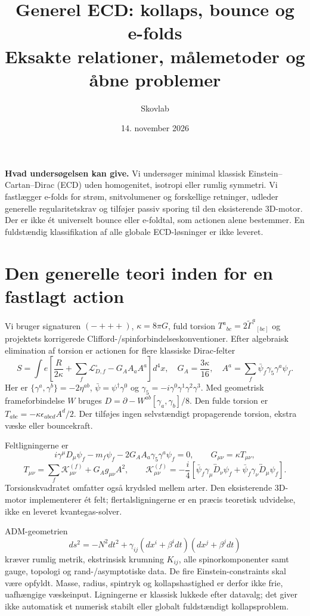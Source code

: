 \documentclass[11pt,a4paper]{article}
\title{Generel ECD: kollaps, bounce og e-folds\\\large Eksakte relationer, målemetoder og åbne problemer}
\author{Skovlab}\date{14. november 2026}
\begin{document}
\maketitle
\textbf{Hvad undersøgelsen kan give.} Vi undersøger minimal klassisk Einstein--Cartan--Dirac (ECD) uden homogenitet, isotropi eller rumlig symmetri. Vi fastlægger e-folds for strøm, snitvolumener og forskellige retninger, udleder generelle regularitetskrav og tilføjer passiv sporing til den eksisterende 3D-motor. Der er ikke ét universelt bounce eller e-foldtal, som actionen alene bestemmer. En fuldstændig klassifikation af alle globale ECD-løsninger er ikke leveret.

\section{Den generelle teori inden for en fastlagt action}
Vi bruger signaturen $(-+++)$, $\kappa=8\pi G$, fuld torsion $T^a{}_{bc}=2\widetilde\Gamma^a{}_{[bc]}$ og projektets korrigerede Clifford-/spinforbindelseskonventioner. Efter algebraisk elimination af torsion er actionen for flere klassiske Dirac-felter
\[
 S=\int e\left[\frac R{2\kappa}+\sum_f\mathcal L_{D,f}^{\circ}-G_A A_aA^a\right]d^4x,
 \quad G_A=\frac{3\kappa}{16},\quad
 A^a=\sum_f\bar\psi_f\gamma_5\gamma^a\psi_f.
\]
Her er $\{\gamma^a,\gamma^b\}=-2\eta^{ab}$, $\bar\psi=\psi^\dagger\gamma^0$ og $\gamma_5=-i\gamma^0\gamma^1\gamma^2\gamma^3$. Med geometrisk frameforbindelse $W$ bruges $D=\partial-W^{ab}[\gamma_a,\gamma_b]/8$. Den fulde torsion er $T_{abc}=-\kappa\epsilon_{abcd}A^d/2$. Der tilføjes ingen selvstændigt propagerende torsion, ekstra væske eller bouncekraft.

Feltligningerne er
\[
 i\gamma^\mu D_\mu\psi_f-m_f\psi_f-2G_A A_a\gamma_5\gamma^a\psi_f=0,
 \qquad G_{\mu\nu}=\kappa T_{\mu\nu},
\]
\[
 T_{\mu\nu}=\sum_f\mathcal K^{(f)}_{\mu\nu}+G_Ag_{\mu\nu}A^2,\qquad
 \mathcal K^{(f)}_{\mu\nu}=-\frac i4[\bar\psi_f\gamma_\mu\overleftrightarrow D_\nu\psi_f+
 \bar\psi_f\gamma_\nu\overleftrightarrow D_\mu\psi_f].
\]
Torsionskvadratet omfatter også krydsled mellem arter. Den eksisterende 3D-motor implementerer ét felt; flertalsligningerne er en præcis teoretisk udvidelse, ikke en leveret kvantegas-solver.

ADM-geometrien
\[
 ds^2=-N^2dt^2+\gamma_{ij}(dx^i+\beta^idt)(dx^j+\beta^jdt)
\]
kræver rumlig metrik, ekstrinsisk krumning $K_{ij}$, alle spinorkomponenter samt gauge, topologi og rand-/asymptotiske data. De fire Einstein-constraints skal være opfyldt. Masse, radius, spintryk og kollapshastighed er derfor ikke frie, uafhængige væskeinput. Ligningerne er klassisk lukkede efter datavalg; det giver ikke automatisk et numerisk stabilt eller globalt fuldstændigt kollapsproblem.
\end{document}
